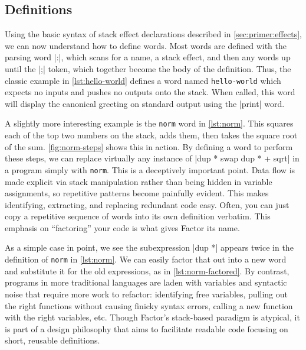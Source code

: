 \subsection{Definitions}\label{sec:primer:colon-defs}



Using the basic syntax of stack effect declarations described in
\cref{sec:primer:effects}, we can now understand how to define words.  Most
words are defined with the parsing word \factor|:|, which scans for a name, a
stack effect, and then any words up until the \factor|;| token, which together
become the body of the definition.  Thus, the classic example in
\vref{lst:hello-world} defines a word named \Verb|hello-world| which expects
no inputs and pushes no outputs onto the stack.  When called, this word will
display the canonical greeting on standard output using the \factor|print|
word.


A slightly more interesting example is the \Verb|norm| word in
\vref{lst:norm}.  This squares each of the top two numbers on the stack, adds
them, then takes the square root of the sum.  \vref{fig:norm-steps} shows this
in action.  By defining a word to perform these steps, we can replace virtually
any instance of
%
\factor|dup * swap dup * + sqrt|
%
in a program simply with \Verb|norm|.  This is a deceptively important point.
Data flow is made explicit via stack manipulation rather than being hidden in
variable assignments, so repetitive patterns become painfully evident.  This
makes identifying, extracting, and replacing redundant code easy.  Often, you
can just copy a repetitive sequence of words into its own definition verbatim.
This emphasis on ``factoring'' your code is what gives Factor its name.


As a simple case in point, we see the subexpression \factor|dup *| appears
twice in the definition of \Verb|norm| in \vref{lst:norm}.  We can easily
factor that out into a new word and substitute it for the old expressions, as
in \vref{lst:norm-factored}.  By contrast, programs in more traditional
languages are laden with variables and syntactic noise that require more work
to refactor: identifying free variables, pulling out the right functions
without causing finicky syntax errors, calling a new function with the right
variables, etc.  Though Factor's stack-based paradigm is atypical, it is part
of a design philosophy that aims to facilitate readable code focusing on short,
reusable definitions.

